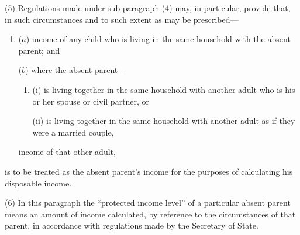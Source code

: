 \documentclass[12pt,a4paper]{article}
\begin{document}
(5) Regulations made under sub-paragraph (4)  may, in particular, provide that, in such circumstances and to such extent as may be prescribed—
\begin{enumerate}\item[]
($a$) income of any child who is living in the same household with the absent parent; and


($b$) where the absent parent—
\begin{enumerate}\item[]
%

(i) is living together in the same household with another adult who is his or her spouse or civil partner, or

(ii) is living together in the same household with another adult as if they were a married couple,

\end{enumerate}
income of that other adult,
\end{enumerate}
is to be treated as the absent parent’s income for the purposes of calculating his disposable income.


(6) In this paragraph the “protected income level” of a particular absent parent means an amount of income calculated, by reference to the circumstances of that parent, in accordance with regulations made by the Secretary of State.
\end{document}
